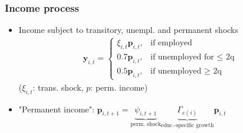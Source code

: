 \documentclass[pdflatex,aspectratio=169]{beamer}
\begin{document}
\begin{frame}
\frametitle{ Income process}

	\begin{itemize}

		\item Income subject to transitory, unempl. and permanent shocks
			\begin{align}
				\mathbf{y}_{i,t} =   \begin{cases}
				\xi_{i,t}\mathbf{p}_{i,t}, & \text{if employed} \\
				0.7 \mathbf{p}_{i,t}, & \text{if unemployed for $\leq$ 2q} \\
				0.5 \mathbf{p}_{i,t}, & \text{if unemployed $\ge$ 2q} 
				\end{cases}
			\end{align}
			($\xi_{i,t}$: trans. shock, $p$: perm. income)
			
		\item "Permanent income":  $\mathbf{p}_{i,t+1} = \underbrace{\psi_{i,t+1}}_{\text{perm. shock}} \underbrace{\Gamma_{e(i)}}_{\text{educ.-specific growth}}\mathbf{p}_{i,t}$ 


	
	\end{itemize}

\end{frame}
\end{document}

